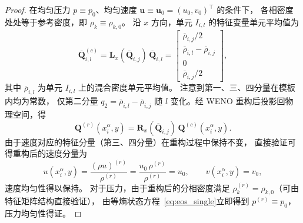 \documentclass[12pt,a4paper]{article}
\numberwithin{equation}{section}    %
\begin{document}
\begin{proof}
    在均匀压力 $p \equiv p_0$、均匀速度
    $\bm{u} \equiv \bm{u}_0 = (u_0, v_0)^\top$ 的条件下，
    各相密度处处等于参考密度，即 $\rho_k \equiv \rho_{k,0}$。
    沿 $x$ 方向，单元 $I_{i,l}$ 的特征变量单元平均值为
    \begin{equation}
        \overline{\bm{Q}}_{i,l}^{(c)}
        = \bm{L}_x(\overline{\bm{Q}}_{i,j})\,\overline{\bm{Q}}_{i,l}
        =
        \begin{bmatrix}
            \overline{\rho}_{i,j}/2 \\[2pt]
            \overline{\rho}_{i,l} - \overline{\rho}_{i,j} \\[2pt]
            0 \\[2pt]
            \overline{\rho}_{i,j}/2
        \end{bmatrix},
    \end{equation}
    其中 $\overline{\rho}_{i,l}$ 为单元 $I_{i,l}$ 上的混合密度单元平均值。
    注意到第一、三、四分量在模板内均为常数，
    仅第二分量 $q_2 = \overline{\rho}_{i,l} - \overline{\rho}_{i,j}$
    随 $l$ 变化。经 WENO 重构后投影回物理空间，得
    \begin{equation}
        \bm{Q}^{(r)}(x_i^\alpha, y)
        = \bm{R}_x(\overline{\bm{Q}}_{i,j})\,\bm{Q}^{(c)}(x_i^\alpha, y).
    \end{equation}
    由于速度对应的特征分量（第三、四分量）在重构过程中保持不变，
    直接验证可得重构后的速度分量为
    \begin{equation}
        u(x_i^\alpha, y)
        = \frac{(\rho u)^{(r)}}{{\rho}^{(r)}}
        = \frac{u_0\,\rho^{(r)}}{\rho^{(r)}} = u_0,
        \qquad
        v(x_i^\alpha, y) = v_0,
    \end{equation}
    速度均匀性得以保持。
    对于压力，由于重构后的分相密度满足
    $\rho_k^{(r)} = \rho_{k,0}$（可由特征矩阵结构直接验证），
    由等熵状态方程~\eqref{eq:eos_single}立即得到
    $p^{(r)} \equiv p_0$，压力均匀性得证。
\end{proof}


\end{document}
